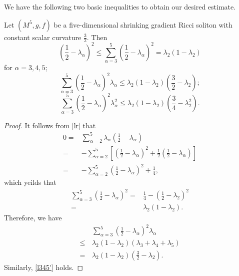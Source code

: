 \documentclass[12pt]{amsart}
\begin{document}
	We have the following two basic inequalities to obtain our desired estimate.
	\begin{lem}
		Let $(M^5, g, f)$ be a five-dimensional shrinking gradient Ricci soliton with constant scalar curvature $\frac{3}{2}$. Then
		\begin{equation} \label{la}
		(\frac{1}{2}-\lambda_\alpha)^2\leq\sum_{\alpha=3}^5(\frac{1}{2}-\lambda_\alpha)^2=\lambda_2(1-\lambda_2)
		\end{equation}
		for $\alpha=3,4,5$;
		\begin{equation}\label{l345}
		\sum_{\alpha=3}^5(\frac{1}{2}-\lambda_\alpha)^2\lambda_\alpha\leq\lambda_2(1-\lambda_2)(\frac{3}{2}-\lambda_2);
		\end{equation}
		\begin{equation}\label{l345'}
		\sum_{\alpha=3}^5(\frac{1}{2}-\lambda_\alpha)^2\lambda_\alpha^2\leq\lambda_2(1-\lambda_2)(\frac{3}{4}-\lambda_2^2).
		\end{equation}
	\end{lem}
	
	
	\begin{proof}
		It follows from \eqref{lr} that
		\begin{equation*}
		\begin{aligned}
		0=&\sum_{\alpha=2}^5\lambda_{\alpha}({\frac{1}{2}}-\lambda_{\alpha})\\
		=&-\sum_{\alpha=2}^5\left[ ({\frac{1}{2}}-\lambda_{\alpha})^2+\frac{1}{2}({\frac{1}{2}}-\lambda_{\alpha})\right] \\
		=&-\sum_{\alpha=2}^5({\frac{1}{2}}-\lambda_\alpha)^2+\frac{1}{4},
		\end{aligned}
		\end{equation*}
		which yeilds that
		\begin{equation*}
		\begin{aligned}
		\sum_{\alpha=3}^5({\frac{1}{2}}-\lambda_{\alpha})^2
		=&\frac{1}{4}-({\frac{1}{2}}-\lambda_2)^2\\
		=&\lambda_2(1-\lambda_2).		
		\end{aligned}
		\end{equation*}
		Therefore, we have
		\begin{equation*}
		\begin{aligned}
		&\,\sum_{\alpha=3}^5(\frac{1}{2}-\lambda_\alpha)^2\lambda_\alpha\\
		\leq&\, \lambda_2(1-\lambda_2) (\lambda_3+\lambda_4+\lambda_5)\\
		=&\,\lambda_2(1-\lambda_2)(\frac{3}{2}-\lambda_2).		
		\end{aligned}
		\end{equation*}
		Similarly, \eqref{l345'} holds.
		
	\end{proof}
	
\end{document}
